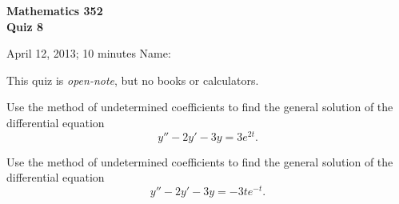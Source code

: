 \documentclass[11pt]{exam}
\begin{document}
\noindent
\textbf{{\large Mathematics 352 \\ Quiz 8}}

\noindent
April 12, 2013; 10 minutes  \hfill Name: \underline{\hspace{3in}} 

\noindent
This quiz is \emph{open-note}, but no books or calculators.

\begin{questions}  

\question Use the method of undetermined coefficients to find the general solution of the differential equation
\[
    y'' - 2y' - 3y = 3e^{2t}.
\]


\newpage

\question Use the method of undetermined coefficients to find the general solution of the differential equation
\[
    y'' - 2y' - 3y = -3te^{-t}.
\]


\end{questions}
\end{document}

